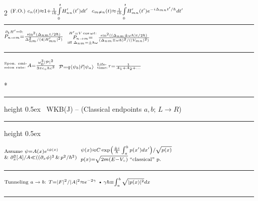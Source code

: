 \documentclass{article}
\makeatletter
\def\HrulefillThin{\leavevmode\leaders\hrule height 0.5ex \hfill\kern\z@}
\newcommand{\YgorUD}[2]{\,\!^{#1}_{#2}}
\renewcommand{\subsection}[1]{%
     \@startsection{subsection}{2}{0mm}{0.01ex}{0.01ex}{%
         \normalfont\Large\bfseries }*{%
         \noindent\HrulefillThin%
              ~#1~\HrulefillThin}}
\makeatother
\begin{document}
\begin{multicols}{2}
$\YgorUD{%
        \text{(F.O.) }%
        c_{ n} ( t ) \approx 1  +  \frac{1}{i\hbar}  \smash{\int\limits_{0}^{t}}%
          H'_{ n n} ( t' ) dt'%
    }{%
        \,%
    }$\hfill\textbullet\hfill%
    $\YgorUD{%
        c_{ m \neq n} ( t ) \approx \frac{1}{i\hbar} \smash{\int\limits_{0}^{t}}%
          H'_{m n} ( t' ) e^{ - i\Delta_{ m n}  t'  / \hbar}  dt '%
    }{%
        \,%
    }$
\hrule

$\YgorUD{%
        \smash{\overset{\partial_{t} H' = 0:%
        }{P_{ n \rightarrow m} =}} %
        \frac{\sin^{ 2} ( \Delta_{ n m}   t  / 2\hbar )}{%
            \Delta_{ n m}^{2} / ( 4 | H'_{ m n} |^{ 2} )}%
    }{%
        \,%
    }$\hfill\textbullet\hfill%
    $\YgorUD{%
        \smash{\underset{\text{iff } \Delta_{ n m} = \pm \hbar\omega%
        }{\overset{H' = V \cos \omega t:%
        }{P_{ n \rightarrow m} =}}} %
        \frac{\sin^{ 2} ( ( \Delta_{ n m}  \pm  \omega\hbar )   t  / 2\hbar )}{%
            ( \Delta_{ n m} \pm  \omega\hbar )^{ 2} / ( | V_{ m n} |^{ 2} )}%
    }{%
        \,%
    }$
\hrule

$\YgorUD{%
        \YgorUD{\text{Spon. emi-}}{\text{ssion rate:}}%
        A = \frac{\omega^{3}_{0} | \mathcal{P} |^{2}}{3 \pi%
        \epsilon_{ \circ}%
        \hbar c^{3}}%
    }{%
        \,%
    }$\hfill\textbullet\hfill%
    $\YgorUD{%
        \mathcal{P} = q \braket{ \psi_{b} |\vec{r}| \psi_{a} }%
    }{%
        \,%
    }$\hfill\textbullet\hfill%
    $\YgorUD{%
        \YgorUD{\text{Life-}}{\text{time:}}%
        \tau = \frac{1}{A_{1} + A_{2} + ...}%
    }{%
        \,%
    }$



\subsection{WKB(J) -- (Classical endpoints $a,b$; $L \rightarrow R$)}

    $\YgorUD{%
        \text{Assume } \psi = A( x )e^{i\phi( x )}%
    }{%
        \text{\& } \partial_{ x}^{2} [ A ] / A \ll %
        \left( ( \partial_{ x}  \phi )^{ 2} \,\&\,%
        p^{ 2} / \hbar^{ 2} \right)%
    }$\hfill\textbullet\hfill%
    $\YgorUD{%
        \psi( x ) \approx C%
        \exp\left(  \frac{\pm i}{\hbar}    \int_{ a}^{ b}  p( x' ) dx' \right)%
         / \sqrt{p( x )}%
    }{%
        p( x ) = \sqrt{2m( E - V_{ \circ} )}%
        \text{ ``classical'' p}.%
    }$
\hrule

    $\YgorUD{%
        \text{Tunneling $a\rightarrow b$: } T=| F |^{ 2} / | A |^{ 2}%
        \approx e^{-2\gamma}%
        \text{ \textbullet }\,%
        \gamma\hbar \equiv \int_{ a}^{ b}   \sqrt{|p ( x ) |^{ 2}}dx%
    }{%
        \,%
    }$
\hrule


\end{multicols}
\end{document}
